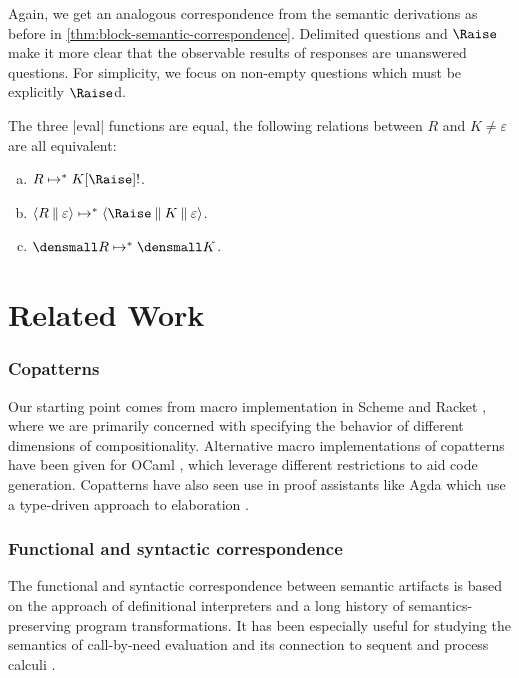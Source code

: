 \documentclass[sigplan,screen]{acmart}
\begin{document}
Again, we get an analogous correspondence from the semantic derivations as
before in \cref{thm:block-semantic-correspondence}.  Delimited questions and
$\Raise$ make it more clear that the observable results of responses are
unanswered questions.  For simplicity, we focus on non-empty questions which
must be explicitly $\Raise$d.

\begin{theorem}
\label{thm:nest-semantic-correspondence}

The three \hs|eval| functions are equal, \ie the following relations between $R$
and $K \neq \varepsilon$ are all equivalent:
\begin{enumerate}[(a)]
\item $R \mapsto^* K[\Raise]\ans$.
\item $\cut{R}{\varepsilon} \mapsto^* \braket{{\Raise} \cmid K \cmid \varepsilon}$.
\item $\den{R} \mapsto^* \den{K}$.
\end{enumerate}
\end{theorem}


\section{Related Work}
\label{sec:related-work}

\subsubsection*{Copatterns}
%
Our starting point comes from macro implementation in Scheme and Racket
\cite{CoScheme}, where we are primarily concerned with specifying the behavior
of different dimensions of compositionality.  Alternative macro implementations
of copatterns have been given for OCaml \cite{LaforgueR17,jeannin_cocaml_2017},
which leverage different restrictions to aid code generation.  Copatterns have
also seen use in proof assistants like Agda
\cite{ElaboratingDependentCopatterns} which use a type-driven approach to
elaboration \cite{UnnestingCopatterns,ThibodeauMasters}.

\subsubsection*{Functional and syntactic correspondence}
%
The functional and syntactic correspondence between semantic artifacts
\cite{FunctionalCorrespondence,SyntacticCorrespondence,SmallStepBigStepMachines,DefunctionalizedInterpreters,InterDerivingSemanticArtifactsOOP,WalkInTheSemanticPark}
is based on the approach of definitional interpreters
\cite{DefinitionalInterpreters} and a long history of semantics-preserving
program transformations.  It has been especially useful for studying the
semantics of call-by-need evaluation
\cite{DefunctionalizedInterpretersCBNeed,InterDerivingSmallStepBigStepCBNeed,SyntheicOperationalCBNeed}
and its connection to sequent \cite{ADHNS2012CCSC} and process calculi
\cite{DMAV2014CPS}.
\end{document}
